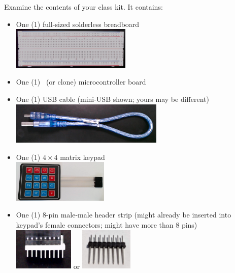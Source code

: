 
Examine the contents of your class kit.
It contains:

\begin{itemize}
    \item One (1) full-sized solderless breadboard \\
        \includegraphics[height=2cm]{inventory/breadboard}
    \item One (1) \developmentboard\ (or clone) microcontroller board \\
        \devboardimage
    \item One (1) USB cable (mini-USB shown;
        yours may be different) \\
        \includegraphics[height=2cm]{inventory/usb}
    \nandchipitem
    \item One (1) $4 \times 4$ matrix keypad \\
        \includegraphics[height=2cm]{inventory/keypad}
    \item One (1) 8-pin male-male header strip (might already be inserted into keypad's female connectors;
        might have more than 8 pins) \\
        \includegraphics[height=2cm]{inventory/keypad-header-in-connector} \hspace{1cm} or
        \hspace{1cm} \includegraphics[height=2cm]{inventory/keypad-header-without-connector}

\end{itemize}
